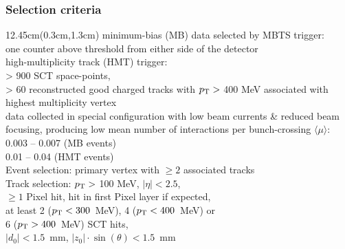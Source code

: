\documentclass[xcolor=dvipsnames]{beamer}
\begin{document}
\begin{frame}
\frametitle{Selection criteria}
\begin{textblock*}{12.45cm}(0.3cm,1.3cm) %
\small{
minimum-bias (MB) data selected by MBTS trigger: \\one counter above threshold from either side of the detector\\[7pt]
high-multiplicity track (HMT) trigger: \\> 900 SCT space-points, \\> 60 reconstructed good charged tracks with $p_{\rm T} >$ 400 MeV associated with highest multiplicity vertex\\[10pt]
data collected in special configuration with low beam currents \& reduced beam focusing, producing low mean number of interactions per bunch-crossing $\langle\mu\rangle$:\\
0.003 -- 0.007 (MB events)\\
0.01 -- 0.04 (HMT events)\\[10pt]
Event selection: primary vertex with $\geq2$ associated tracks\\%
\vspace{0.3cm}
Track selection: $p_{\rm T} >$ 100 MeV, $|\eta|<2.5$,\\
\hspace{2.5cm}$\geq1$ Pixel hit, hit in first Pixel layer if expected, \\
\hspace{2.5cm}at least 2 ($p_{\rm T}< 300$~MeV), 4 ($p_{\rm T}<  400$~MeV) or \\\hspace{2.5cm}6 ($p_{\rm T}> 400$~MeV) SCT hits,\\
\hspace{2.5cm}$|d_0|<1.5$~mm,\hspace{0.4cm} $|z_0|\cdot  \sin(\theta)<1.5$~mm
}

\end{textblock*}
\end{frame}
\end{document}
